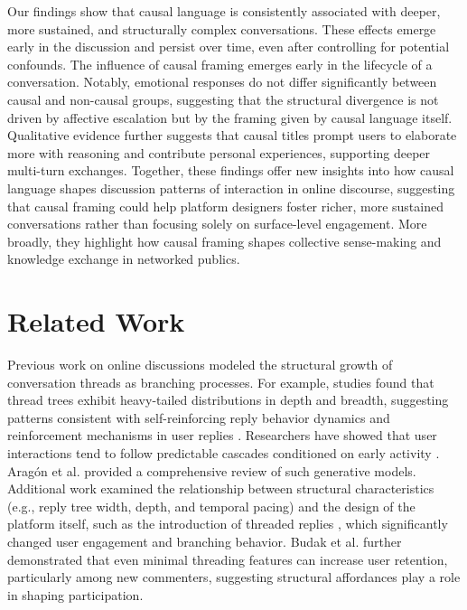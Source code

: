\documentclass[acmsmall]{acmart}
\begin{document}
Our findings show that causal language is consistently associated with deeper, more sustained, and structurally complex conversations. These effects emerge early in the discussion and persist over time, even after controlling for potential confounds. The influence of causal framing emerges early in the lifecycle of a conversation. Notably, emotional responses do not differ significantly between causal and non-causal groups, suggesting that the structural divergence is not driven by affective escalation but by the framing given by causal language itself. Qualitative evidence further suggests that causal titles prompt users to elaborate more with reasoning and contribute personal experiences, supporting deeper multi-turn exchanges. Together, these findings offer new insights into how causal language shapes discussion patterns of interaction in online discourse, suggesting that causal framing could help platform designers foster richer, more sustained conversations rather than focusing solely on surface-level engagement. More broadly, they highlight how causal framing shapes collective sense-making and knowledge exchange in networked publics.








\section{Related Work}


Previous work on online discussions modeled the structural growth of conversation threads as branching processes. For example, studies found that thread trees exhibit heavy-tailed distributions in depth and breadth, suggesting patterns consistent with self-reinforcing reply behavior dynamics and reinforcement mechanisms in user replies \cite{gomez2008statistical, kumar2010dynamics}. Researchers have showed that user interactions tend to follow predictable cascades conditioned on early activity \cite{gomez2013likelihood, medvedev2019modelling, medvedev2017anatomy}. Aragón et al. \cite{aragon2017generative} provided a comprehensive review of such generative models. Additional work examined the relationship between structural characteristics (e.g., reply tree width, depth, and temporal pacing) and the design of the platform itself, such as the introduction of threaded replies \cite{aragon2017thread}, which significantly changed user engagement and branching behavior. Budak et al. \cite{budak2017threading} further demonstrated that even minimal threading features can increase user retention, particularly among new commenters, suggesting structural affordances play a role in shaping participation.
\end{document}
